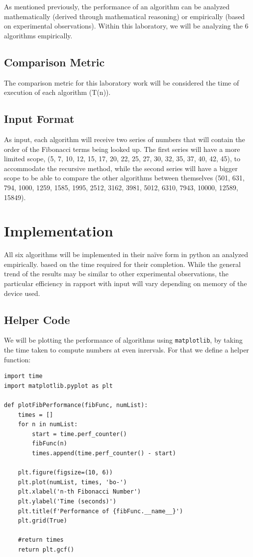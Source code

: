 \documentclass[a4paper, 12pt]{article}
\begin{document}
As mentioned previously, the performance of an algorithm can be analyzed mathematically
(derived through mathematical reasoning) or empirically (based on experimental observations).
Within this laboratory, we will be analyzing the 6 algorithms empirically.
\subsection{Comparison Metric}
\label{sec:orgfae4a6a}
The comparison metric for this laboratory work will be considered the time of execution of each algorithm (T(n)).
\subsection{Input Format}
\label{sec:org913c5ec}
As input, each algorithm will receive two series of numbers that will contain the order of the
Fibonacci terms being looked up. The first series will have a more limited scope, (5, 7, 10, 12, 15, 17, 20,
22, 25, 27, 30, 32, 35, 37, 40, 42, 45), to accommodate the recursive method, while the second series will
have a bigger scope to be able to compare the other algorithms between themselves (501, 631, 794, 1000,
1259, 1585, 1995, 2512, 3162, 3981, 5012, 6310, 7943, 10000, 12589, 15849).
\section{Implementation}
\label{sec:org178d09a}
All six algorithms will be implemented in their naïve form in python an analyzed empirically.
based on the time required for their completion. While the general trend of the results may be similar to
other experimental observations, the particular efficiency in rapport with input will vary depending on memory of the device used.
\subsection{Helper Code}
\label{sec:orgf0edea2}
We will be plotting the performance of algorithms using \texttt{matplotlib}, by taking the time taken to compute numbers at even inrervals. For that we define a helper function:
\begin{verbatim}
import time
import matplotlib.pyplot as plt

def plotFibPerformance(fibFunc, numList):
    times = []
    for n in numList:
        start = time.perf_counter()
        fibFunc(n)
        times.append(time.perf_counter() - start)

    plt.figure(figsize=(10, 6))
    plt.plot(numList, times, 'bo-')
    plt.xlabel('n-th Fibonacci Number')
    plt.ylabel('Time (seconds)')
    plt.title(f'Performance of {fibFunc.__name__}')
    plt.grid(True)

    #return times
    return plt.gcf()
\end{verbatim}
\end{document}
